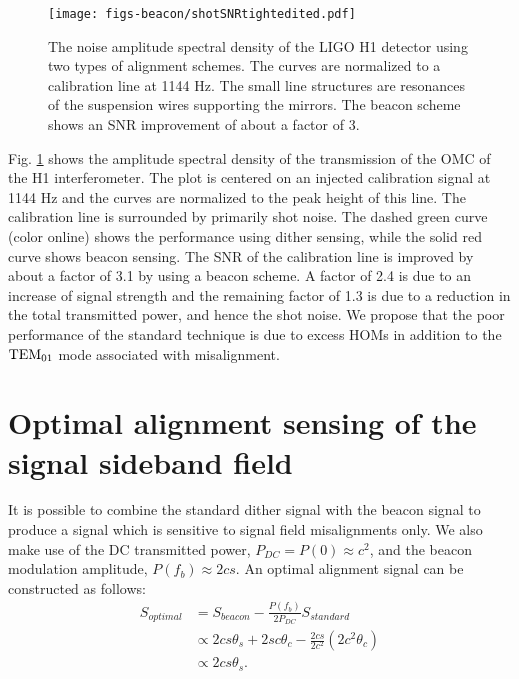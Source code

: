 %
\begin{figure}
  \begin{center}
  \leavevmode
  \texttt{[image: figs-beacon/shotSNRtightedited.pdf]}
  \end{center}
  \caption[An instance of the noise performance of beacon alignment sensing.]{The noise amplitude spectral density of the LIGO H1 detector using two types of alignment schemes. The curves are normalized to a calibration line at 1144 Hz.  The small line structures are resonances of the suspension wires supporting the mirrors. The beacon scheme shows an SNR improvement of about a factor of 3.}
  \label{fig:shotnoise}
\end{figure}

Fig. %
\ref{fig:shotnoise} shows the amplitude spectral density of the transmission of the OMC of the H1 interferometer. %
The plot is centered on an injected calibration signal at 1144 Hz and the curves are normalized to the peak height of this line. %
The calibration line is surrounded by primarily shot noise. %
The dashed green curve (color online) shows the performance using dither sensing, while the solid red curve shows beacon sensing. %
The SNR of the calibration line is improved by about a factor of 3.1 by using a beacon scheme. %
A factor of 2.4 is due to an increase of signal strength and the remaining factor of 1.3 is due to a reduction in the total transmitted power, and hence the shot noise. %
We propose that the poor performance of the standard technique is due to excess HOMs in addition to the ${\rm TEM}_{01}$ mode associated with misalignment.

\section{Optimal alignment sensing of the signal sideband field}
It is possible to combine the standard dither signal with the beacon signal to produce a signal which is sensitive to signal field misalignments only. %
We also make use of the DC transmitted power, $P_{DC} = P(0) \approx c^2$, and the beacon modulation amplitude, $P(f_b) \approx 2cs$. %
An optimal alignment signal can be constructed as follows:
%
\begin{align}
\label{eq:optsig}
S_{optimal} &= S_{beacon} - \frac{P(f_b)}{2P_{DC}} S_{standard}\\
\nonumber &\propto 2cs\theta_s+2sc\theta_c-\frac{2cs}{2c^2}(2c^2\theta_c) \\
\nonumber &\propto 2cs\theta_s.
\end{align}
%

